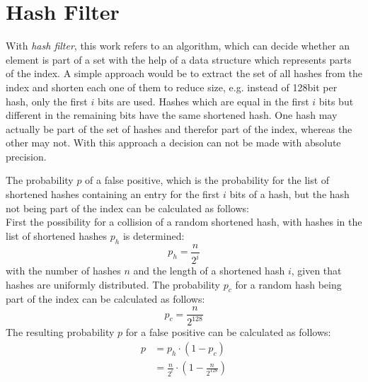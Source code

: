 \section{Hash Filter}\label{section:implementation/hash_filter}
With \textit{hash filter}, this work refers to an algorithm, which can decide whether an element is part of a set with the help of a data structure which represents parts of the index.
A simple approach would be to extract the set of all hashes from the index and shorten each one of them to reduce size, e.g. instead of 128bit per hash, only the first $i$ bits are used.
Hashes which are equal in the first $i$ bits but different in the remaining bits have the same shortened hash.
One hash may actually be part of the set of hashes and therefor part of the index, whereas the other may not.
With this approach a decision can not be made with absolute precision.

The probability $p$ of a false positive, which is the probability for the list of shortened hashes containing an entry for the first $i$ bits of a hash, but the hash not being part of the index can be calculated as follows:\\
First the possibility for a collision of a random shortened hash, with hashes in the list of shortened hashes $p_h$ is determined:
\begin{equation}
	p_h=\frac{n}{2^i}
\end{equation}
with the number of hashes $n$ and the length of a shortened hash $i$, given that hashes are uniformly distributed.
The probability $p_c$ for a random hash being part of the index can be calculated as follows:
\begin{equation}
	p_c=\frac{n}{2^{128}}
\end{equation}
The resulting probability $p$ for a false positive can be calculated as follows:
\begin{equation}
	\begin{split}
		p&=p_h\cdot (1-p_c) \\[10pt]
		&= \frac{n}{2^i}\cdot \left(1-\frac{n}{2^{128}}\right)
	\end{split}
\end{equation}

